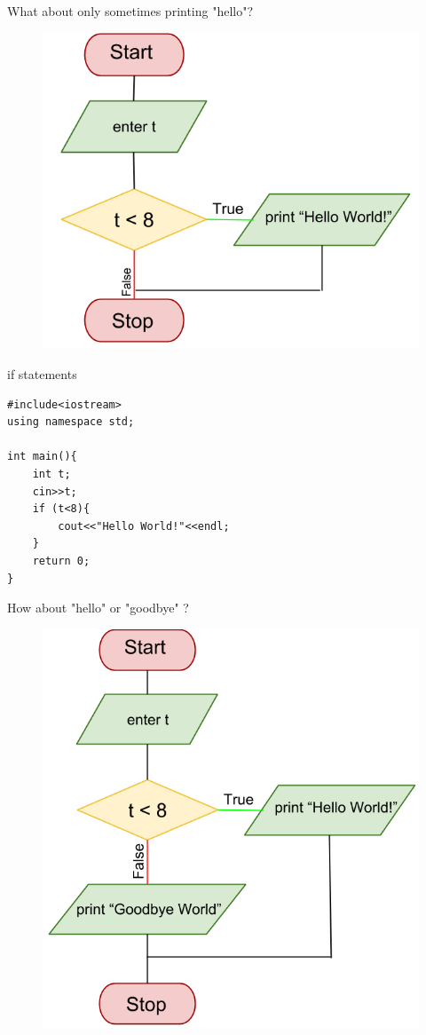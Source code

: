 \documentclass[xcolor={dvipsnames}]{beamer}
\begin{document}
\begin{frame}{ What about only sometimes printing "hello"?}
	\pause
	\begin{center}
	\begin{figure}
		\includegraphics[width=.9\textwidth]{helloif}
	\end{figure}
	\end{center}
\end{frame}

\begin{frame}[fragile]{if statements}
\begin{verbatim}
#include<iostream>
using namespace std;

int main(){
    int t;
    cin>>t;
    if (t<8){
        cout<<"Hello World!"<<endl;
    }
    return 0;
}
\end{verbatim}
\end{frame}

\begin{frame}{How about "hello" or "goodbye" ?}
	\pause
	\begin{center}
	\begin{figure}
		\includegraphics[width=.7\textwidth]{hellogoodbye}
	\end{figure}
	\end{center}
\end{frame}
\end{document}
